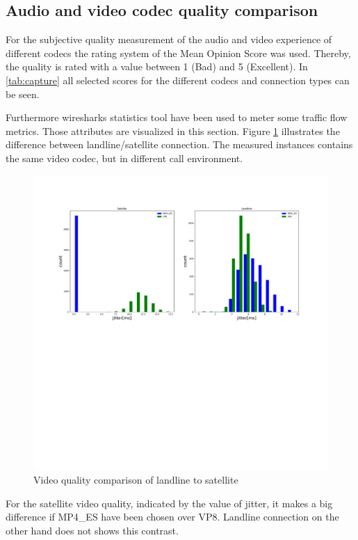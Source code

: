 \documentclass[parskip=full]{scrartcl}
\begin{document}
\subsection{Audio and video codec quality comparison} \label{subsec:audio}
For the subjective quality measurement of the audio and video experience of different codecs the rating system of the Mean Opinion Score was used.
Thereby, the quality is rated with a value between 1 (Bad) and 5 (Excellent). 
In \cref{tab:capture} all selected scores for the different codecs and connection types can be seen.

Furthermore wiresharks statistics tool have been used to meter some traffic flow metrics. Those attributes are visualized in this section. Figure \ref{fig:comparison} illustrates the difference between landline/satellite connection. The measured instances contains the same video codec, but in different call environment. 

\begin{figure}[!ht]
	\centering %
	\includegraphics[width=\textwidth]{images/comparison.pdf} %
	\caption{Video quality comparison of landline to satellite} 
	\label{fig:comparison} %
\end{figure} 

For the satellite video quality, indicated by the value of jitter, it makes a big difference if MP4\_ES have been chosen over VP8. Landline connection on the other hand does not shows this contrast.
\end{document}

